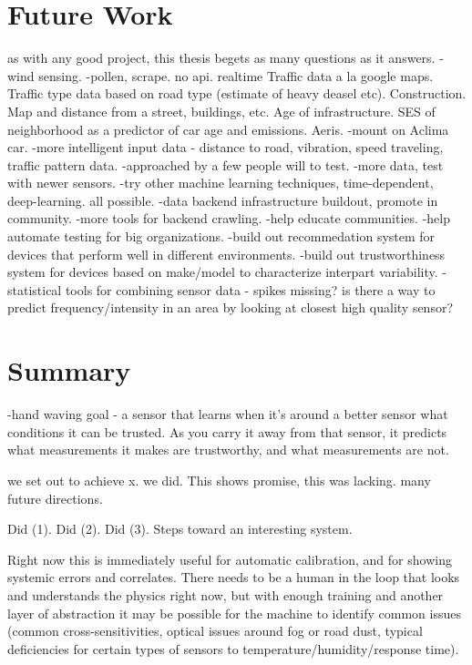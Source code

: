 \section{Future Work}

as with any good project, this thesis begets as many questions as it answers.
-wind sensing.
-pollen, scrape. no api.  realtime Traffic data a la google maps.  Traffic type data based on road type (estimate of heavy deasel etc).  Construction.  Map and distance from a street, buildings, etc.  Age of infrastructure.  SES of neighborhood as a predictor of car age and emissions.  Aeris.
-mount on Aclima car.
-more intelligent input data - distance to road, vibration, speed traveling, traffic pattern data.
-approached by a few people will to test.
-more data, test with newer sensors.
-try other machine learning techniques, time-dependent, deep-learning.  all possible.
-data backend infrastructure buildout, promote in community.
-more tools for backend crawling.
-help educate communities.
-help automate testing for big organizations.
-build out recommedation system for devices that perform well in different environments.
-build out trustworthiness system for devices based on make/model to characterize interpart variability.
-statistical tools for combining sensor data - spikes missing?  is there a way to predict frequency/intensity in an area by looking at closest high quality sensor?


\section{Summary}

-hand waving goal - a sensor that learns when it's around a better sensor what conditions it can be trusted.  As you carry it away from that sensor, it predicts what measurements it makes are trustworthy, and what measurements are not.

we set out to achieve x.  we did.  This shows promise, this was lacking.  many future directions.

Did (1). Did (2).  Did (3).  Steps toward an interesting system.

Right now this is immediately useful for automatic calibration, and for showing systemic errors and correlates.  There needs to be a human in the loop that looks and understands the physics right now, but with enough training and another layer of abstraction it may be possible for the machine to identify common issues (common cross-sensitivities, optical issues around fog or road dust, typical deficiencies for certain types of sensors to temperature/humidity/response time).

























